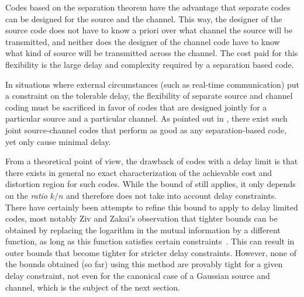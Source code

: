 Codes based on the separation theorem have the advantage that separate codes can
be designed for the source and the channel. This way, the designer of the source
code does not have to know a priori over what channel the source will be
transmitted, and neither does the designer of the channel code have to know what
kind of source will be transmitted across the channel. The cost paid for this
flexibility is the large delay and complexity required by a separation based
code. 

In situations where external circumstances (such as real-time communication) put
a constraint on the tolerable delay, the flexibility of separate source and
channel coding must be sacrificed in favor of codes that are designed jointly
for a particular source and a particular channel. As pointed out in
, there exist such joint source-channel codes that perform
as good as any separation-based code, yet only cause minimal delay.

%
From a theoretical point of view, the drawback of codes with a delay limit is
that there exists in general no exact characterization of the achievable cost
and distortion region for such codes. While the bound of
 still applies, it only depends on the \emph{ratio}
$k/n$ and therefore does not take into account delay constraints. There have
certainly been attempts to refine this bound to apply to delay limited codes,
most notably Ziv and Zakai's observation that tighter bounds can be obtained by
replacing the logarithm in the mutual information by a different function, as
long as this function satisfies certain constraints~\cite{ZivZ1973}. This can
result in outer bounds that become tighter for stricter delay constraints.
However, none of the bounds obtained (so far) using this method are provably
tight for a given delay constraint, not even for the canonical case of a
Gaussian source and channel, which is the subject of the next section.

